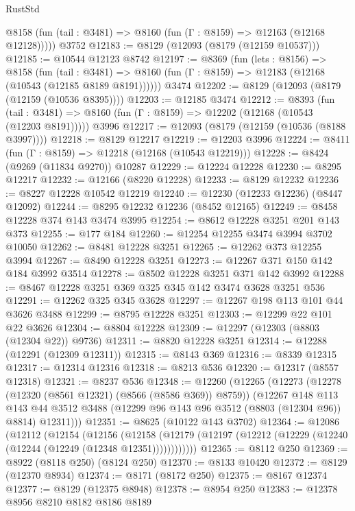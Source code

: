 \begin{lexlean}{RustStd}
\begin{coremodule}
      @8158 (fun (tail : @3481) => @8160 (fun (Γ : @8159) => @12163 (@12168 @12128)))))
    @3752
@12183 := @8129 (@12093 (@8179 (@12159 @10537)))
@12185 := @10544 @12123 @8742
@12197 := @8369
    (fun (lets : @8156) =>
    @8158
      (fun (tail : @3481) =>
      @8160 (fun (Γ : @8159) => @12183 (@12168 (@10543 (@12185 @8189 @8191))))))
    @3474
@12202 := @8129 (@12093 (@8179 (@12159 (@10536 @8395))))
@12203 := @12185 @3474
@12212 := @8393
    (fun (tail : @3481) => @8160 (fun (Γ : @8159) => @12202 (@12168 (@10543 (@12203 @8191)))))
    @3996
@12217 := @12093 (@8179 (@12159 (@10536 (@8188 @3997))))
@12218 := @8129 @12217
@12219 := @12203 @3996
@12224 := @8411 (fun (Γ : @8159) => @12218 (@12168 (@10543 @12219)))
@12228 := @8424 (@9269 (@11834 @9270)) @10287
@12229 := @12224 @12228
@12230 := @8295 @12217
@12232 := @12166 (@8220 @12228)
@12233 := @8129 @12232
@12236 := @8227 @12228 @10542 @12219
@12240 := @12230 (@12233 @12236) (@8447 @12092)
@12244 := @8295 @12232 @12236 (@8452 @12165)
@12249 := @8458 @12228 @374 @143 @3474 @3995
@12254 := @8612 @12228 @3251 @201 @143 @373
@12255 := @177 @184
@12260 := @12254 @12255 @3474 @3994 @3702 @10050
@12262 := @8481 @12228 @3251
@12265 := @12262 @373 @12255 @3994
@12267 := @8490 @12228 @3251
@12273 := @12267 @371 @150 @142 @184 @3992 @3514
@12278 := @8502 @12228 @3251 @371 @142 @3992
@12288 := @8467 @12228 @3251 @369 @325 @345 @142 @3474 @3628 @3251 @536
@12291 := @12262 @325 @345 @3628
@12297 := @12267 @198 @113 @101 @44 @3626 @3488
@12299 := @8795 @12228 @3251
@12303 := @12299 @22 @101 @22 @3626
@12304 := @8804 @12228
@12309 := @12297 (@12303 (@8803 (@12304 @22)) @9736)
@12311 := @8820 @12228 @3251
@12314 := @12288 (@12291 (@12309 @12311))
@12315 := @8143 @369
@12316 := @8339 @12315
@12317 := @12314 @12316
@12318 := @8213 @536
@12320 := @12317 (@8557 @12318)
@12321 := @8237 @536
@12348 := @12260
    (@12265
      (@12273
        (@12278 (@12320 (@8561 @12321) (@8566 (@8586 @369)) @8759))
        (@12267
          @148
          @113
          @143
          @44
          @3512
          @3488
          (@12299 @96 @143 @96 @3512 (@8803 (@12304 @96)) @8814)
          @12311)))
@12351 := @8625 (@10122 @143 @3702)
@12364 := @12086
    (@12112
      (@12154
        (@12156
          (@12158 (@12179 (@12197 (@12212 (@12229 (@12240 (@12244 (@12249 (@12348 @12351))))))))))))
@12365 := @8112 @250
@12369 := @8922 (@8118 @250) (@8124 @250)
@12370 := @8133 @10420
@12372 := @8129 (@12370 @8934)
@12374 := @8171 (@8172 @250)
@12375 := @8167 @12374
@12377 := @8129 (@12375 @8948)
@12378 := @8954 @250
@12383 := @12378 @8956 @8210 @8182 @8186 @8189

\end{coremodule}
\end{lexlean}
